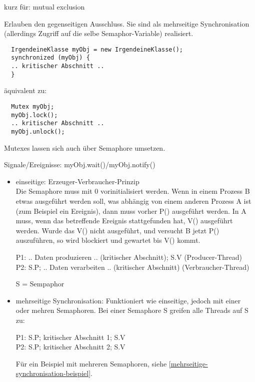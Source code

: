 \begin{answer}
kurz für: mutual exclusion

Erlauben den gegenseitigen Ausschluss. Sie sind als mehrseitige Synchronisation (allerdings Zugriff auf die selbe Semaphor-Variable) realisiert.

\begin{verbatim}
  IrgendeineKlasse myObj = new IrgendeineKlasse();
  synchronized (myObj) {
  .. kritischer Abschnitt ..
  }
\end{verbatim}

äquivalent zu:

\begin{verbatim}
  Mutex myObj;
  myObj.lock();
  .. kritischer Abschnitt ..
  myObj.unlock();
\end{verbatim}

Mutexes lassen sich auch über Semaphore umsetzen.

Signale/Ereignisse: myObj.wait()/myObj.notify()
\end{answer}

\begin{answer}
\begin{itemize}

  \item einseitige: Erzeuger-Verbraucher-Prinzip \\
    Die Semaphore muss mit 0 vorinitialisiert werden. Wenn in einem Prozess B etwas ausgeführt werden soll, was abhängig von einem anderen Prozess A ist (zum Beispiel ein Ereignis), dann muss vorher P() ausgeführt werden. In A muss, wenn das betreffende Ereignis stattgefunden hat, V() ausgeführt werden. Wurde das V() nicht ausgeführt, und versucht B jetzt P() auszuführen, so wird blockiert und gewartet bis V() kommt.

    P1: .. Daten produzieren .. (kritischer Abschnitt); S.V (Producer-Thread) \\
    P2: S.P; .. Daten verarbeiten .. (kritischer Abschnitt) (Verbraucher-Thread)

    S = Sempaphor

  \item mehrseitige Synchronisation: Funktioniert wie einseitige, jedoch mit einer oder mehren Semaphoren.
        Bei einer Semaphore S greifen alle Threads auf S zu:

      P1: S.P; kritischer Abschnitt 1; S.V \\
      P2: S.P; kritischer Abschnitt 2; S.V

        Für ein Beispiel mit mehreren Semaphoren, siehe \ref{mehrseitige-synchronisation-beispiel}.

\end{itemize}
\end{answer}

